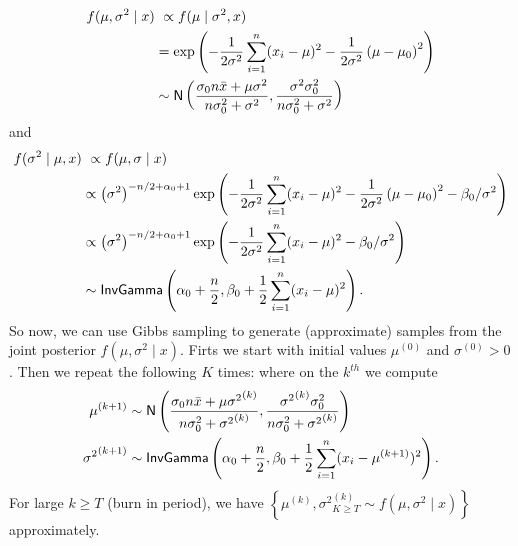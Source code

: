 \begin{exam}
    \begin{align*}
        f (\mu, \sigma^2 \mid x)
         & \
        \propto f (\mu \mid \sigma^2 , x)                                                                                                                  \\
         & = \exp \left( - \frac{1}{2\sigma^2} \sum_{i=1}^{n} (x_i - \mu)^2 - \frac{1}{2\sigma^2} \left( \mu - \mu_0 \right)^2 \right)                     \\
         & \sim {\sf N} \left( \frac{\sigma_0 n \bar{x} + \mu \sigma^2}{n \sigma_0^2 + \sigma^2}, \frac{\sigma^2 \sigma_0^2}{n \sigma_0^2 + \sigma^2} \right)
    \end{align*}
    and
    \begin{align*}
        f (\sigma^2 \mid \mu, x)
         & \
        \propto f (\mu, \sigma \mid x)                                                                                                                                                                          \\
         & \propto \left( \sigma^2 \right)^{-n/2 + \alpha_0 + 1} \exp \left( - \frac{1}{2\sigma^2} \sum_{i=1}^{n} (x_i - \mu)^2 - \frac{1}{2\sigma^2} \left( \mu - \mu_0 \right)^2 - \beta_0 / \sigma^2 \right) \\
         & \propto \left( \sigma^2 \right)^{-n/2 + \alpha_0 + 1} \exp \left( - \frac{1}{2\sigma^2} \sum_{i=1}^{n} (x_i - \mu)^2- \beta_0 / \sigma^2 \right)                                                     \\
         & \sim {\sf InvGamma} \left( \alpha_0 + \frac{n}{2}, \beta_0 + \frac{1}{2} \sum_{i=1}^{n} (x_i - \mu)^2 \right).
    \end{align*}
    So now, we can use Gibbs sampling to generate (approximate) samples from the joint posterior $f(\mu , \sigma^2 \mid x)$. Firts we start with initial values $\mu^{(0)}$ and $\sigma^{(0)} > 0$. Then we repeat the following $K$ times: where on the $k^{th}$ we compute
    \begin{align*}
        \mu^{(k+1)}        & \sim {\sf N} \left( \frac{\sigma_0 n \bar{x} + \mu {\sigma^2}^{(k)}}{n \sigma_0^2 + {\sigma^2}^{(k)}}, \frac{{\sigma^2}^{(k)} \sigma_0^2}{n \sigma_0^2 + {\sigma^2}^{(k)}} \right) \\
        {\sigma^2}^{(k+1)} & \sim {\sf InvGamma} \left( \alpha_0 + \frac{n}{2}, \beta_0 + \frac{1}{2} \sum_{i=1}^{n} (x_i - {\mu}^{(k+1)})^2 \right).
    \end{align*}
    For large $k \geq T$ (burn in period), we have $\left\{ \mu^{(k)}, {\sigma^{2}}^{(k)}_{K \geq T} \sim f(\mu , \sigma^2 \mid x) \right\}$ approximately.
\end{exam}

